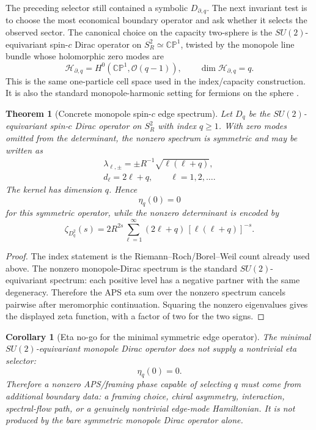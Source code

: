 \documentclass[aps,prd,reprint,nofootinbib,superscriptaddress,floatfix]{revtex4-2}
\numberwithin{equation}{section}
\theoremstyle{definition}
\theoremstyle{plain}
\newtheorem{theorem}{Theorem}[section]
\newtheorem{corollary}{Corollary}[section]
\begin{document}
The preceding selector still contained a symbolic \(D_{\partial,q}\).  The
next invariant test is to choose the most economical boundary operator and
ask whether it selects the observed sector.  The canonical choice on the
capacity two-sphere is the \(SU(2)\)-equivariant spin-\(c\) Dirac operator
on \(S^2_R\simeq\mathbb{CP}^1\), twisted by the monopole line bundle whose
holomorphic zero modes are
\[
\mathcal H_{\partial,q}=H^0(\mathbb{CP}^1,\mathcal O(q-1)),
\qquad
\dim\mathcal H_{\partial,q}=q .
\]
This is the same one-particle cell space used in the index/capacity
construction.  It is also the standard monopole-harmonic setting for
fermions on the sphere \cite{WuYang1976,Dolan2020QHDirac}.

\begin{theorem}[Concrete monopole spin-\(c\) edge spectrum]
\label{thm:concrete-dirac-spectrum}
Let \(D_q\) be the \(SU(2)\)-equivariant spin-\(c\) Dirac operator on
\(S^2_R\) with index \(q\ge1\).  With zero modes omitted from the
determinant, the nonzero spectrum is symmetric and may be written as
\begin{equation}
\boxed{
\begin{gathered}
\lambda_{\ell,\pm}
=
\pm R^{-1}\sqrt{\ell(\ell+q)},\\
d_\ell=2\ell+q,
\qquad
\ell=1,2,\ldots .
\end{gathered}}
\end{equation}
The kernel has dimension \(q\).  Hence
\begin{equation}
\boxed{
\eta_q(0)=0
}
\end{equation}
for this symmetric operator, while the nonzero determinant is encoded by
\begin{equation}
\boxed{
\zeta_{D_q^2}(s)
=
2R^{2s}
\sum_{\ell=1}^{\infty}
(2\ell+q)\,[\ell(\ell+q)]^{-s}.
}
\end{equation}
\end{theorem}

\begin{proof}
The index statement is the Riemann--Roch/Borel--Weil count already used
above.  The nonzero monopole-Dirac spectrum is the standard
\(SU(2)\)-equivariant spectrum: each positive level has a negative partner
with the same degeneracy.  Therefore the APS eta sum over the nonzero
spectrum cancels pairwise after meromorphic continuation.  Squaring the
nonzero eigenvalues gives the displayed zeta function, with a factor of
two for the two signs.
\end{proof}

\begin{corollary}[Eta no-go for the minimal symmetric edge operator]
The minimal \(SU(2)\)-equivariant monopole Dirac operator does not supply a
nontrivial eta selector:
\[
\eta_q(0)=0 .
\]
Therefore a nonzero APS/framing phase capable of selecting \(q\) must come
from additional boundary data: a framing choice, chiral asymmetry,
interaction, spectral-flow path, or a genuinely nontrivial edge-mode
Hamiltonian.  It is not produced by the bare symmetric monopole Dirac
operator alone.
\end{corollary}
\end{document}
